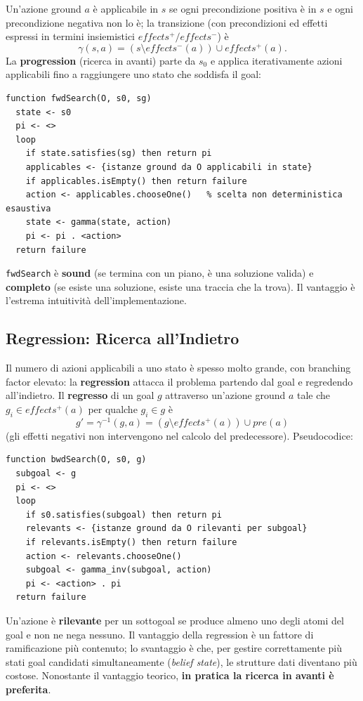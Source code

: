 \documentclass[a4paper,11pt]{article}
\begin{document}
Un'azione ground $a$ è applicabile in $s$ se ogni precondizione positiva è in $s$ e ogni precondizione negativa non lo è; la transizione (con precondizioni ed effetti espressi in termini insiemistici $effects^+/effects^-$) è
\[
\gamma(s,a) = (s\setminus effects^-(a))\cup effects^+(a).
\]
La \textbf{progression} (ricerca in avanti) parte da $s_0$ e applica iterativamente azioni applicabili fino a raggiungere uno stato che soddisfa il goal:
\begin{lstlisting}
function fwdSearch(O, s0, sg)
  state <- s0
  pi <- <>
  loop
    if state.satisfies(sg) then return pi
    applicables <- {istanze ground da O applicabili in state}
    if applicables.isEmpty() then return failure
    action <- applicables.chooseOne()   % scelta non deterministica esaustiva
    state <- gamma(state, action)
    pi <- pi . <action>
  return failure
\end{lstlisting}
\texttt{fwdSearch} è \textbf{sound} (se termina con un piano, è una soluzione valida) e \textbf{completo} (se esiste una soluzione, esiste una traccia che la trova). Il vantaggio è l'estrema intuitività dell'implementazione.

\subsection{Regression: Ricerca all'Indietro}

Il numero di azioni applicabili a uno stato è spesso molto grande, con branching factor elevato: la \textbf{regression} attacca il problema partendo dal goal e regredendo all'indietro. Il \textbf{regresso} di un goal $g$ attraverso un'azione ground $a$ tale che $g_i\in effects^+(a)$ per qualche $g_i\in g$ è
\[
g' = \gamma^{-1}(g,a) = (g\setminus effects^+(a))\cup pre(a)
\]
(gli effetti negativi non intervengono nel calcolo del predecessore). Pseudocodice:
\begin{lstlisting}
function bwdSearch(O, s0, g)
  subgoal <- g
  pi <- <>
  loop
    if s0.satisfies(subgoal) then return pi
    relevants <- {istanze ground da O rilevanti per subgoal}
    if relevants.isEmpty() then return failure
    action <- relevants.chooseOne()
    subgoal <- gamma_inv(subgoal, action)
    pi <- <action> . pi
  return failure
\end{lstlisting}
Un'azione è \textbf{rilevante} per un sottogoal se produce almeno uno degli atomi del goal e non ne nega nessuno. Il vantaggio della regression è un fattore di ramificazione più contenuto; lo svantaggio è che, per gestire correttamente più stati goal candidati simultaneamente (\emph{belief state}), le strutture dati diventano più costose. Nonostante il vantaggio teorico, \textbf{in pratica la ricerca in avanti è preferita}.
\end{document}
